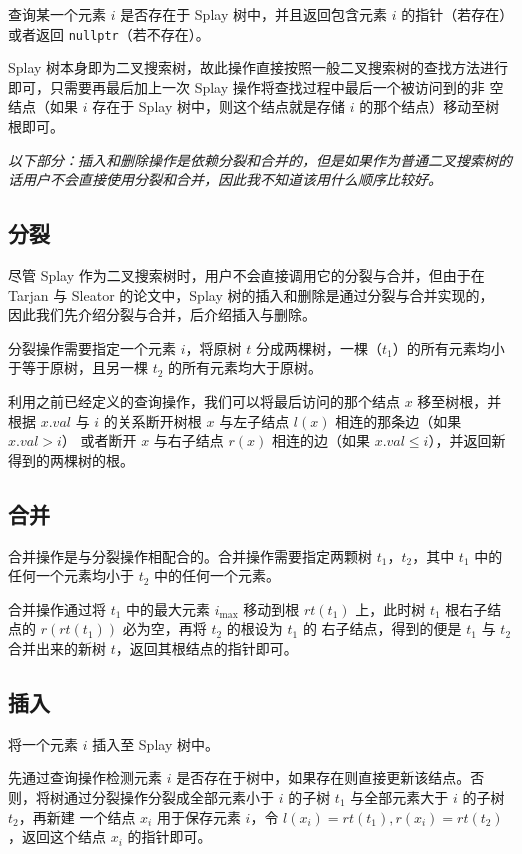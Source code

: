 \documentclass{ctexart}
\begin{document}
    查询某一个元素 $i$ 是否存在于 Splay 树中，并且返回包含元素 $i$ 的指针（若存在）或者返回 \verb|nullptr|（若不存在）。

    Splay 树本身即为二叉搜索树，故此操作直接按照一般二叉搜索树的查找方法进行即可，只需要再最后加上一次 Splay 操作将查找过程中最后一个被访问到的非
    空结点（如果 $i$ 存在于 Splay 树中，则这个结点就是存储 $i$ 的那个结点）移动至树根即可。

    {\noindent \textit{以下部分：插入和删除操作是依赖分裂和合并的，但是如果作为普通二叉搜索树的话用户不会直接使用分裂和合并，因此我不知道该用什么顺序比较好。}}

    \subsection{分裂}

    尽管 Splay 作为二叉搜索树时，用户不会直接调用它的分裂与合并，但由于在 Tarjan 与 Sleator 的论文中，Splay 树的插入和删除是通过分裂与合并实现的，
    因此我们先介绍分裂与合并，后介绍插入与删除。

    分裂操作需要指定一个元素 $i$，将原树 $t$ 分成两棵树，一棵（$t_1$）的所有元素均小于等于原树，且另一棵 $t_2$ 的所有元素均大于原树。

    利用之前已经定义的查询操作，我们可以将最后访问的那个结点 $x$ 移至树根，并根据 $x.val$ 与 $i$ 的关系断开树根 $x$ 与左子结点 $l(x)$ 相连的那条边（如果 $x.val > i$）
    或者断开 $x$ 与右子结点 $r(x)$ 相连的边（如果 $x.val \leq i$），并返回新得到的两棵树的根。

    \subsection{合并}

    合并操作是与分裂操作相配合的。合并操作需要指定两颗树 $t_1$，$t_2$，其中 $t_1$ 中的任何一个元素均小于 $t_2$ 中的任何一个元素。

    合并操作通过将 $t_1$ 中的最大元素 $i_\mathrm{max}$ 移动到根 $rt(t_1)$ 上，此时树 $t_1$ 根右子结点的 $r(rt(t_1))$ 必为空，再将 $t_2$ 的根设为 $t_1$ 的
    右子结点，得到的便是 $t_1$ 与 $t_2$ 合并出来的新树 $t$，返回其根结点的指针即可。

    \subsection{插入}

    将一个元素 $i$ 插入至 Splay 树中。

    先通过查询操作检测元素 $i$ 是否存在于树中，如果存在则直接更新该结点。否则，将树通过分裂操作分裂成全部元素小于 $i$ 的子树 $t_1$ 与全部元素大于 $i$ 的子树 $t_2$，再新建
    一个结点 $x_i$ 用于保存元素 $i$，令 $l(x_i) = rt(t_1), r(x_i) = rt(t_2)$，返回这个结点 $x_i$ 的指针即可。
\end{document}
